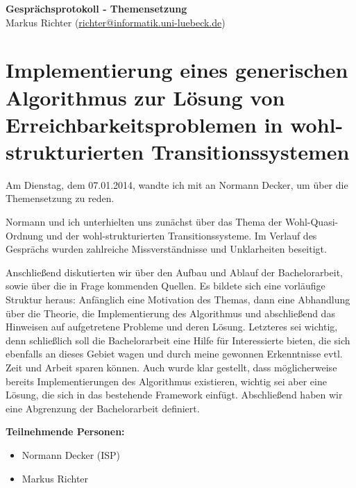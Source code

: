 \documentclass[
  a4paper,               %
  twoside,               %
  headings=small,        %
  DIV=12,                %
  BCOR=1cm,              %
  headinclude=true,      %
  footinclude=true,      %
  numbers=noenddot,      %
  11pt]{scrartcl}        %
\begin{document}
\begin{center}
\textbf{\huge Gesprächsprotokoll - Themensetzung} \\[1em]
Markus Richter (\url{richter@informatik.uni-luebeck.de})
\end{center}


\section*{Implementierung eines generischen Algorithmus zur Lösung von Erreichbarkeitsproblemen in wohl-strukturierten Transitionssystemen}
Am Dienstag, dem 07.01.2014, wandte ich mit an Normann Decker, um über die Themensetzung zu reden.

Normann und ich unterhielten uns zunächst über das Thema der Wohl-Quasi-Ordnung und der wohl-strukturierten Transitionssysteme. Im Verlauf des Gesprächs wurden zahlreiche Missverständnisse und Unklarheiten beseitigt. 

Anschließend diskutierten wir über den Aufbau und Ablauf der Bachelorarbeit, sowie über die in Frage kommenden Quellen. Es bildete sich eine vorläufige Struktur heraus: Anfänglich eine Motivation des Themas, dann eine Abhandlung über die Theorie, die Implementierung des Algorithmus und abschließend das Hinweisen auf aufgetretene Probleme und deren Lösung. Letzteres sei wichtig, denn schließlich soll die Bachelorarbeit eine Hilfe für Interessierte bieten, die sich ebenfalls an dieses Gebiet wagen und durch meine gewonnen Erkenntnisse evtl. Zeit und Arbeit sparen können. Auch wurde klar gestellt, dass möglicherweise bereits Implementierungen des Algorithmus existieren, wichtig sei aber eine Lösung, die sich in das bestehende Framework einfügt. Abschließend haben wir eine Abgrenzung der Bachelorarbeit definiert.   \bigskip

\textbf{Teilnehmende Personen:}\smallskip

\begin{itemize}
\item Normann Decker (ISP)
\item Markus Richter
\end{itemize}
\end{document}
